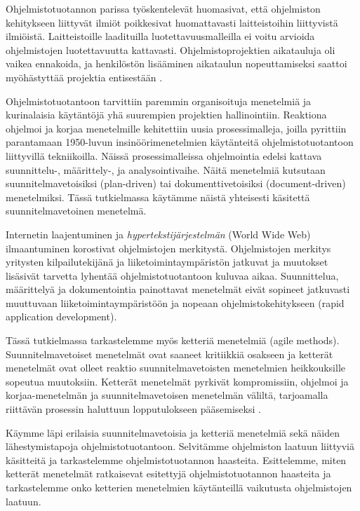 \documentclass[finnish]{tktltiki2}
\theoremstyle{definition}
\theoremstyle{remark}
\begin{document}
Ohjelmistotuotannon parissa työskentelevät huomasivat, että ohjelmiston kehitykseen liittyvät ilmiöt poikkesivat huomattavasti laitteistoihin liittyvistä ilmiöistä. Laitteistoille laadituilla luotettavuusmalleilla ei voitu arvioida ohjelmistojen luotettavuutta kattavasti. Ohjelmistoprojektien aikatauluja oli vaikea ennakoida, ja henkilöstön lisääminen aikataulun nopeuttamiseksi saattoi myöhästyttää projektia entisestään \cite{BOE06}.

Ohjelmistotuotantoon tarvittiin paremmin organisoituja menetelmiä ja kurinalaisia käytäntöjä yhä suurempien projektien hallinointiin. Reaktiona ohjelmoi ja korjaa menetelmille kehitettiin uusia prosessimalleja, joilla pyrittiin parantamaan 1950-luvun insinöörimenetelmien käytänteitä ohjelmistotuotantoon liittyvillä tekniikoilla. Näissä prosessimalleissa ohjelmointia edelsi kattava suunnittelu-, määrittely-, ja analysointivaihe. Näitä menetelmiä kutsutaan suunnitelmavetoisiksi (plan-driven) \cite{BOE02} tai dokumenttivetoisiksi (document-driven) \cite{BOE88} menetelmiksi. Tässä tutkielmassa käytämme näistä yhteisesti käsitettä suunnitelmavetoinen menetelmä.

Internetin laajentuminen ja \textit{hypertekstijärjestelmän} (World Wide Web) ilmaantuminen korostivat ohjelmistojen merkitystä. Ohjelmistojen merkitys yritysten kilpailutekijänä ja liiketoimintaympäristön jatkuvat ja muutokset lisäsivät tarvetta lyhentää ohjelmistotuotantoon kuluvaa aikaa. Suunnittelua, määrittelyä ja dokumentointia painottavat menetelmät eivät sopineet jatkuvasti muuttuvaan liiketoimintaympäristöön ja nopeaan ohjelmistokehitykseen (rapid application development)\cite{BOE06}.

Tässä tutkielmassa tarkastelemme myös ketteriä menetelmiä (agile methods). Suunnitelmavetoiset menetelmät ovat saaneet kritiikkiä osakseen ja ketterät menetelmät ovat olleet reaktio suunnitelmavetoisten menetelmien heikkouksille sopeutua muutoksiin. Ketterät menetelmät pyrkivät kompromissiin, ohjelmoi ja korjaa-menetelmän ja suunnitelmavetoisen menetelmän väliltä, tarjoamalla riittävän prosessin haluttuun lopputulokseen pääsemiseksi \cite{FOW01a}. 

Käymme läpi erilaisia suunnitelmavetoisia ja ketteriä menetelmiä sekä näiden lähestymistapoja ohjelmistotuotantoon. Selvitämme ohjelmiston laatuun liittyviä käsitteitä ja tarkastelemme ohjelmistotuotannon haasteita. Esittelemme, miten ketterät menetelmät ratkaisevat esitettyjä ohjelmistotuotannon haasteita ja tarkastelemme onko ketterien menetelmien käytänteillä vaikutusta ohjelmistojen laatuun.
\end{document}
